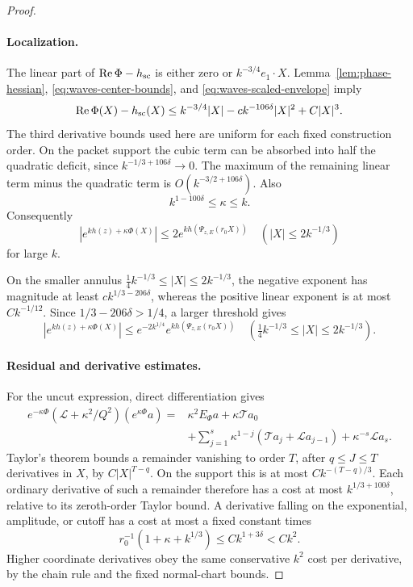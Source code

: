 \begin{proof}
\paragraph{Localization.}
The linear part of
\(\operatorname{Re}\Phi-h_{\rm sc}\) is either zero or
\(k^{-3/4}e_1\cdot X\). Lemma~\ref{lem:phase-hessian},
\eqref{eq:waves-center-bounds}, and
\eqref{eq:waves-scaled-envelope} imply
\begin{equation}\label{eq:waves-localization}
 \operatorname{Re}\Phi(X)-h_{\rm sc}(X)
 \le k^{-3/4}|X|-c k^{-106\delta}|X|^2+C|X|^3.
\end{equation}
The third derivative bounds used here are uniform for each fixed
construction order. On the packet support the cubic term can be
absorbed into half the quadratic deficit, since
\(k^{-1/3+106\delta}\to0\).
The maximum of the remaining linear term minus the quadratic term
is \(O(k^{-3/2+106\delta})\). Also
\[
 k^{1-100\delta}\le\kappa\le k.
\]
Consequently
\[
 |e^{kh(z)+\kappa\Phi(X)}|
 \le 2e^{kh(\Psi_{z,E}(r_0X))}
 \quad (|X|\le2k^{-1/3})
\]
for large \(k\).

On the smaller annulus
\(\tfrac14k^{-1/3}\le|X|\le2k^{-1/3}\), the negative exponent has
magnitude at least \(ck^{1/3-206\delta}\), whereas the positive linear
exponent is at most \(Ck^{-1/12}\). Since
\(1/3-206\delta>1/4\), a larger threshold gives
\begin{equation}\label{eq:waves-exponential-tail}
 |e^{kh(z)+\kappa\Phi(X)}|
 \le e^{-2k^{1/4}}e^{kh(\Psi_{z,E}(r_0X))}
 \quad\left(\tfrac14k^{-1/3}\le|X|\le2k^{-1/3}\right).
\end{equation}

\paragraph{Residual and derivative estimates.}
For the uncut expression, direct differentiation gives
\[
 \begin{split}
 e^{-\kappa\Phi}
 (\mathcal L+\kappa^2/Q^2)(e^{\kappa\Phi}a)
 ={}&\kappa^2E_\Phi a+\kappa\mathcal Ta_0\\
 &+\sum_{j=1}^s\kappa^{1-j}
       (\mathcal Ta_j+\mathcal La_{j-1})
       +\kappa^{-s}\mathcal La_s.
 \end{split}
\]
Taylor's theorem bounds a remainder vanishing to order \(T\), after
\(q\le J\le T\) derivatives in \(X\), by \(C|X|^{T-q}\).
On the support this is at most \(Ck^{-(T-q)/3}\).
Each ordinary derivative of such a remainder therefore has a cost
at most \(k^{1/3+100\delta}\), relative to its zeroth-order Taylor
bound. A derivative falling on the exponential, amplitude, or cutoff
has a cost at most a fixed constant times
\[
 r_0^{-1}(1+\kappa+k^{1/3})\le Ck^{1+3\delta}<Ck^2.
\]
Higher coordinate derivatives obey the same conservative \(k^2\)
cost per derivative, by the chain rule and the fixed normal-chart
bounds.


\end{proof}
